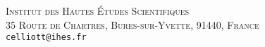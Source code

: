 \documentclass[10pt, oneside]{article}
\begin{document}
\begin{comment}
The first condition is always satisfied if $k$ is large enough compared to the degree of $P$.  The second condition is a little trickier -- the obstruction to surjectivity is the condition that the deformation of the section of $\gg_P(k)$ corresponding to the prescribed deformation of the residues can be extended across $\infty$.  This seems to be satisfied only for elements $(\ell_1, \ldots, \ell_k)$ satisfying $\sum_{i=1}^k \ell_i = 0$, which would mean the moduli stack would essentially never be classical.

\begin{remark}
There's a separate condition involving the $\omega^\vee_{z_i}$ for a classical closed point $(P,\phi)$ with the appropriate residues to even exist, saying that the $\omega^\vee_{z_i}$ are conjugate to elements summing to zero.  This condition should essentially be that $\sum_{i=1}^k \tr(\omega^\vee_{z_i}) = 0$, but I'm not sure if it's literally that at the moment.
\end{remark}

Ok, now let's compute the virtual dimension at the point $(P,\phi)$ assuming condition 1) above is satisfied.  I can do this at least for $G = \GL_n$.

\begin{prop}
Assuming $\gg_P(-k-2)$ has no global sections, the virtual dimension of $\mr{Higgs}_{\GL_n}^\mr{fr}(\bb {CP}^1; D, \omega^\vee)$ at a point $(P,\exp(\phi)$ in the image of the exponential map is 
\[kn^2 - \sum_{i=1}^k \dim Z_{\gl_n}(\omega^\vee_{z_i}).\]
\end{prop}

\begin{example}
If $G = \GL_n$ and all the residues $\omega^\vee_{z_i}$ are regular semisimple, then the virtual dimension of the moduli space is $k(n^2-n)$.
\end{example}

\begin{remark}
Note that the moduli stack of Higgs bundles in this language is not only always derived, but always stacky -- the tangent complex always has a non-trivial $H^{-1}$.  Furthermore the dimension of $H^0$ of the tangent complex depends on the choice of $G$-bundle $P$, as does the dimension of the automorphism group acting on it.  It's only in the quotient that these dependencies cancel out.  This cancelling also only happens when the condition on $\gg_P(k-2)$ is satisfied: if $k$ is too small then we'll once again see a dependence on the degree of the principal $G$-bundle.
\end{remark}

\begin{remark}
Note that there's no reason for the virtual dimension of the moduli space to always be even: the sign depends on the choice of residues $\omega^\vee_{z_i}$.
\end{remark}
\end{comment}

\textsc{Institut des Hautes \'Etudes Scientifiques}\\
\textsc{35 Route de Chartres, Bures-sur-Yvette, 91440, France}\\
\texttt{celliott@ihes.fr}\\
\vspace{5pt}
\end{document}

